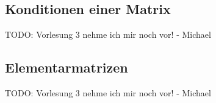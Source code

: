
\subsection{Konditionen einer Matrix}
TODO: Vorlesung 3 nehme ich mir noch vor! - Michael


\subsection{Elementarmatrizen}
TODO: Vorlesung 3 nehme ich mir noch vor! - Michael

